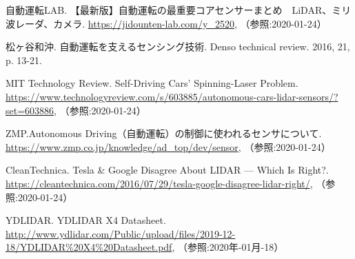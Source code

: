 {\small
\begin{thebibliography}{9}
   自動運転LAB. 【最新版】自動運転の最重要コアセンサーまとめ　LiDAR、ミリ波レーダ、カメラ. \url{https://jidounten-lab.com/y_2520}, （参照:2020-01-24）

   松ヶ谷和沖. 自動運転を支えるセンシング技術. Denso technical review. 2016, 21, p. 13-21.

   MIT Technology Review. Self-Driving Cars’ Spinning-Laser Problem. \url{https://www.technologyreview.com/s/603885/autonomous-cars-lidar-sensors/?set=603886}, （参照:2020-01-24）

   ZMP.Autonomous Driving（自動運転）の制御に使われるセンサについて. \url{https://www.zmp.co.jp/knowledge/ad_top/dev/sensor}, （参照:2020-01-24）

   CleanTechnica. Tesla \& Google Disagree About LIDAR — Which Is Right?. \url{https://cleantechnica.com/2016/07/29/tesla-google-disagree-lidar-right/}, （参照:2020-01-24）



   YDLIDAR. YDLIDAR X4 Datasheet. \url{http://www.ydlidar.com/Public/upload/files/2019-12-18/YDLIDAR%20X4%20Datasheet.pdf}, （参照:2020年-01月-18）

\end{thebibliography}
}